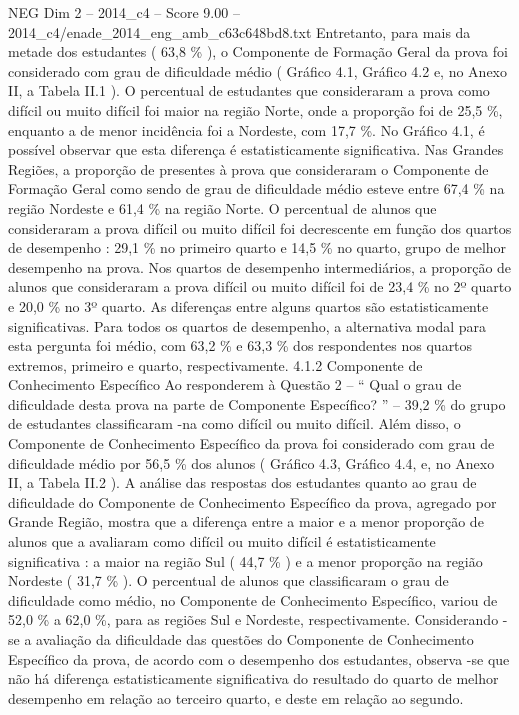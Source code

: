 \begin{textsample}{NEG Dim 2 – 2014\_c4 – Score 9.00 – 2014\_c4/enade\_2014\_eng\_amb\_c63c648bd8.txt}
Entretanto, para mais da metade dos estudantes ( 63,8 \% ), o Componente de Formação Geral da prova foi considerado com grau de dificuldade médio ( Gráfico 4.1, Gráfico 4.2 e, no Anexo II, a Tabela II.1 ).
O percentual de estudantes que consideraram a prova como difícil ou muito difícil foi maior na região Norte, onde a proporção foi de 25,5 \%, enquanto a de menor incidência foi a Nordeste, com 17,7 \%.
No Gráfico 4.1, é possível observar que esta diferença é estatisticamente significativa.
Nas Grandes Regiões, a proporção de presentes à prova que consideraram o Componente de Formação Geral como sendo de grau de dificuldade médio esteve entre 67,4 \% na região Nordeste e 61,4 \% na região Norte.
O percentual de alunos que consideraram a prova difícil ou muito difícil foi decrescente em função dos quartos de desempenho : 29,1 \% no primeiro quarto e 14,5 \% no quarto, grupo de melhor desempenho na prova.
Nos quartos de desempenho intermediários, a proporção de alunos que consideraram a prova difícil ou muito difícil foi de 23,4 \% no 2º quarto e 20,0 \% no 3º quarto.
As diferenças entre alguns quartos são estatisticamente significativas.
Para todos os quartos de desempenho, a alternativa modal para esta pergunta foi médio, com 63,2 \% e 63,3 \% dos respondentes nos quartos extremos, primeiro e quarto, respectivamente. 4.1.2 Componente de Conhecimento Específico Ao responderem à Questão 2 – “ Qual o grau de dificuldade desta prova na parte de Componente Específico? ” – 39,2 \% do grupo de estudantes classificaram -na como difícil ou muito difícil.
Além disso, o Componente de Conhecimento Específico da prova foi considerado com grau de dificuldade médio por 56,5 \% dos alunos ( Gráfico 4.3, Gráfico 4.4, e, no Anexo II, a Tabela II.2 ).
A análise das respostas dos estudantes quanto ao grau de dificuldade do Componente de Conhecimento Específico da prova, agregado por Grande Região, mostra que a diferença entre a maior e a menor proporção de alunos que a avaliaram como difícil ou muito difícil é estatisticamente significativa : a maior na região Sul ( 44,7 \% ) e a menor proporção na região Nordeste ( 31,7 \% ).
O percentual de alunos que classificaram o grau de dificuldade como médio, no Componente de Conhecimento Específico, variou de 52,0 \% a 62,0 \%, para as regiões Sul e Nordeste, respectivamente.
Considerando -se a avaliação da dificuldade das questões do Componente de Conhecimento Específico da prova, de acordo com o desempenho dos estudantes, observa -se que não há diferença estatisticamente significativa do resultado do quarto de melhor desempenho em relação ao terceiro quarto, e deste em relação ao segundo.

\end{textsample}
